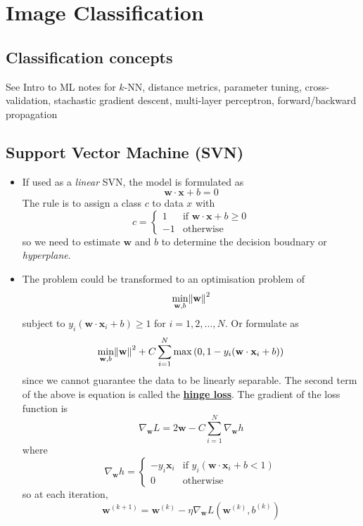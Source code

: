 \documentclass[twocolumn,landscape,10pt]{article}
\theoremstyle{definition}
\begin{document}
\section{Image Classification}

\subsection{Classification concepts}

See Intro to ML notes for $k$-NN, distance metrics, parameter tuning,
cross-validation, stachastic gradient descent, multi-layer perceptron,
forward/backward propagation


\subsection{Support Vector Machine (SVN)}

\begin{itemize}
    \item If used as a \emph{linear} SVN, the model is formulated as
        \[
            \mathbf{w}\cdot\mathbf{x}+b=0
        \]
        The rule is to assign a class $c$ to data $x$ with
        \[
            c=
            \begin{cases}
                1 & \text{if }\mathbf{w}\cdot\mathbf{x}+b\ge 0 \\
                -1 & \text{otherwise}
            \end{cases} 
        \]
        so we need to estimate $\mathbf{w}$ and $b$ to determine the decision
        boudnary or \emph{hyperplane}.
    \item The problem could be transformed to an optimisation problem of
        \[
            \underset{\mathbf{w},b}{\text{min}}\norm{\mathbf{w}}^2
        \]
        subject to $y_i(\mathbf{w}\cdot \mathbf{x}_i+b)\ge 1$ for $i=1,2,\ldots,N$.
        Or formulate as
        \[
            \underset{\mathbf{w},b}{\text{min}}\norm{\mathbf{w}}^2
            +C\sum_{i=1}^{N} \max{(0,1-y_i(\mathbf{w}\cdot \mathbf{x}_i+b))}
        \]
        since we cannot guarantee the data to be linearly separable.
        The second term of the above is equation is called the
        \underline{\textbf{hinge loss}}.
        The gradient of the loss function is
        \[
            \nabla_\mathbf{w}L=2\mathbf{w}-C\sum_{i=1}^{N}\nabla_\mathbf{w}h
        \]
        where
        \[
            \nabla_\mathbf{w}h=
            \begin{cases}
                -y_i\mathbf{x}_i & \text{if }y_i(\mathbf{w}\cdot\mathbf{x}_i+b < 1) \\
                0 & \text{otherwise}
            \end{cases} 
        \]
        so at each iteration,
        \[
            \mathbf{w}^{(k+1)}=\mathbf{w}^{(k)}-\eta\nabla_\mathbf{w}L(\mathbf{w}^{(k)},b^{(k)})
        \]
\end{itemize} 
\end{document}
